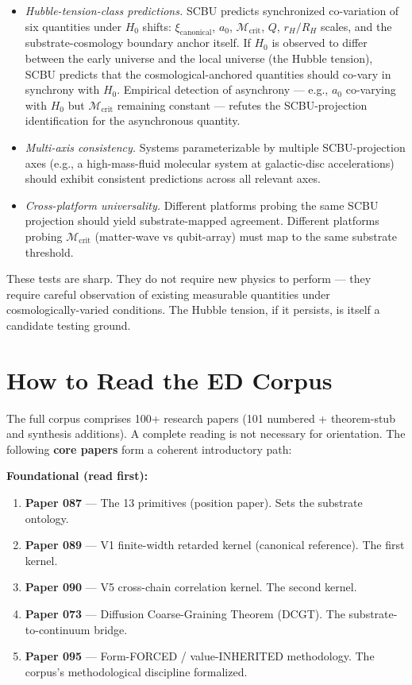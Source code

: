 \documentclass[11pt,a4paper]{article}
\begin{document}
\begin{itemize}[noitemsep]
\item \emph{Hubble-tension-class predictions.} SCBU predicts synchronized co-variation of six quantities under $H_0$ shifts: $\xi_\mathrm{canonical}$, $a_0$, $\mathcal{M}_\mathrm{crit}$, $Q$, $r_H/R_H$ scales, and the substrate-cosmology boundary anchor itself. If $H_0$ is observed to differ between the early universe and the local universe (the Hubble tension), SCBU predicts that the cosmological-anchored quantities should co-vary in synchrony with $H_0$. Empirical detection of asynchrony --- e.g., $a_0$ co-varying with $H_0$ but $\mathcal{M}_\mathrm{crit}$ remaining constant --- refutes the SCBU-projection identification for the asynchronous quantity.
\item \emph{Multi-axis consistency.} Systems parameterizable by multiple SCBU-projection axes (e.g., a high-mass-fluid molecular system at galactic-disc accelerations) should exhibit consistent predictions across all relevant axes.
\item \emph{Cross-platform universality.} Different platforms probing the same SCBU projection should yield substrate-mapped agreement. Different platforms probing $\mathcal{M}_\mathrm{crit}$ (matter-wave vs qubit-array) must map to the same substrate threshold.
\end{itemize}

These tests are sharp. They do not require new physics to perform --- they require careful observation of existing measurable quantities under cosmologically-varied conditions. The Hubble tension, if it persists, is itself a candidate testing ground.

\section{How to Read the ED Corpus}

The full corpus comprises 100+ research papers (101 numbered + theorem-stub and synthesis additions). A complete reading is not necessary for orientation. The following \textbf{core papers} form a coherent introductory path:

\textbf{Foundational (read first):}

\begin{enumerate}[noitemsep]
\item \textbf{Paper 087} --- The 13 primitives (position paper). Sets the substrate ontology.
\item \textbf{Paper 089} --- V1 finite-width retarded kernel (canonical reference). The first kernel.
\item \textbf{Paper 090} --- V5 cross-chain correlation kernel. The second kernel.
\item \textbf{Paper 073} --- Diffusion Coarse-Graining Theorem (DCGT). The substrate-to-continuum bridge.
\item \textbf{Paper 095} --- Form-FORCED / value-INHERITED methodology. The corpus's methodological discipline formalized.
\end{enumerate}
\end{document}
